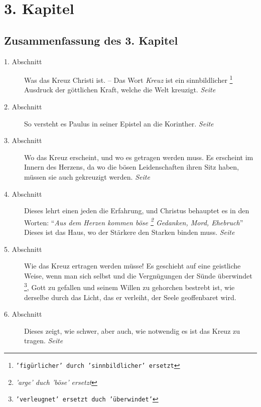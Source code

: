 

\chapter{3. Kapitel} \label{kap3}

\section{Zusammenfassung des 3. Kapitel}


\begin{description}
\item[1. Abschnitt] Was das Kreuz Christi ist. -- Das Wort \textit{Kreuz} ist ein
sinnbildlicher
\footnote{\texttt{'figürlicher' durch 'sinnbildlicher' ersetzt}}
Ausdruck der göttlichen Kraft, welche die Welt kreuzigt.
\dotfill \textit{Seite \pageref{kap3_ab1}}\\
\item[2. Abschnitt] So versteht es Paulus in seiner Epistel an die
Korinther.
\dotfill \textit{Seite \pageref{kap3_ab2}}\\
\item[3. Abschnitt] Wo das Kreuz erscheint, und wo es getragen werden muss. Es
erscheint im Innern des Herzens, da wo die bösen Leidenschaften ihren Sitz haben,
müssen sie auch gekreuzigt werden.
\dotfill \textit{Seite \pageref{kap3_ab3}}\\
\item[4. Abschnitt] Dieses lehrt einen jeden
die Erfahrung, und Christus
behauptet es in den Worten: "`\textit{Aus dem Herzen kommen böse
\footnote{\textit{'arge' duch 'böse' ersetzt}} Gedanken, Mord,
Ehebruch}"' Dieses ist das Haus, wo der Stärkere den Starken binden muss.
\dotfill \textit{Seite \pageref{kap3_ab4}}\\
\item[5. Abschnitt] Wie das Kreuz ertragen werden müsse! Es geschieht auf eine
geistliche Weise, wenn man sich selbst und die Vergnügungen der Sünde überwindet
\footnote{\texttt{'verleugnet' ersetzt duch 'überwindet'}}, Gott zu gefallen und
seinem Willen zu gehorchen bestrebt ist, wie
derselbe durch das Licht, das er verleiht, der Seele geoffenbaret wird.
\item[6. Abschnitt] Dieses zeigt, wie schwer, aber auch, wie notwendig es ist
das Kreuz zu tragen.
\dotfill \textit{Seite \pageref{kap3_ab5}}\\
\end{description}

\newpage

